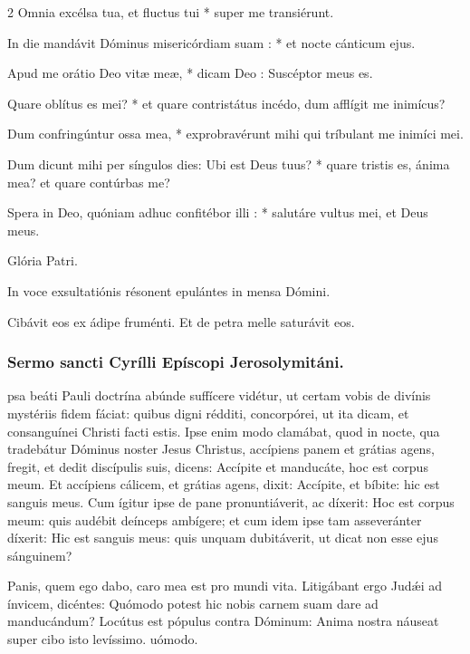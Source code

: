\documentclass[9pt,twoside]{extarticle}
\begin{document}
\begin{multicols}{2}
Omnia excélsa tua, et fluctus tui * super me transiérunt.

In die mandávit Dóminus misericórdiam suam : * et nocte cánticum ejus.

Apud me orátio Deo vitæ meæ, * dicam Deo : Suscéptor meus es.

Quare oblítus es mei? * et quare contristátus incédo, dum afflígit me inimícus?

Dum confringúntur ossa mea, * exprobravérunt mihi qui tríbulant me inimíci mei.

Dum dicunt mihi per síngulos dies: Ubi est Deus tuus? * quare tristis es, ánima mea? et quare contúrbas me?

Spera in Deo, quóniam adhuc confitébor illi : * salutáre vultus mei, et Deus meus.

Glória Patri.

\begin{tightlist}{}
\item {} In voce exsultatiónis résonent epulántes in mensa Dómini.
\item {} Cibávit eos ex ádipe fruménti.  Et de petra melle saturávit eos.
\end{tightlist}

\subsubsection*{\center Sermo sancti Cyrílli Epíscopi Jerosolymitáni.}
psa beáti Pauli doctrína abúnde suffícere vidétur, ut certam vobis de divínis mystériis fidem fáciat: quibus digni rédditi, concorpórei, ut ita dicam, et consanguínei Christi facti estis. Ipse enim modo clamábat, quod in nocte, qua tradebátur Dóminus noster Jesus Christus, accípiens panem et grátias agens, fregit, et dedit discípulis suis, dicens: Accípite et manducáte, hoc est corpus meum. Et accípiens cálicem, et grátias agens, dixit: Accípite, et bíbite: hic est sanguis meus. Cum ígitur ipse de pane pronuntiáverit, ac díxerit: Hoc est corpus meum: quis audébit deínceps ambígere; et cum idem ipse tam asseveránter díxerit: Hic est sanguis meus: quis unquam dubitáverit, ut dicat non esse ejus sánguinem?

\begin{tightlist}{}
\item {} Panis, quem ego dabo, caro mea est pro mundi vita. Litigábant ergo Judǽi ad ínvicem, dicéntes: \textred{*} Quómodo potest hic nobis carnem suam dare ad manducándum?  Locútus est pópulus contra Dóminum: Anima nostra náuseat super cibo isto levíssimo. uómodo.
\end{tightlist}


\end{multicols}
\end{document}
